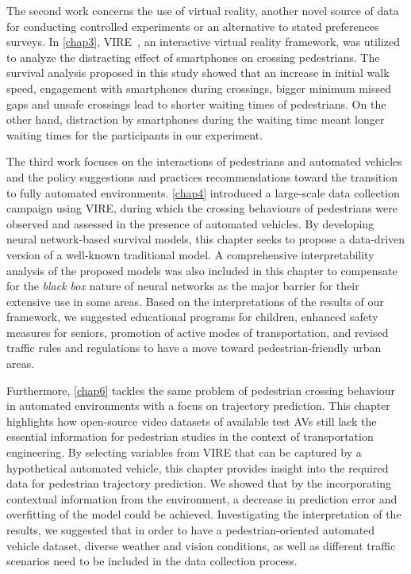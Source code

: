 The second work concerns the use of virtual reality, another novel source of data for conducting controlled experiments or an alternative to stated preferences surveys. In \cref{chap3}, VIRE~\cite{farooqvire}, an interactive virtual reality framework, was utilized to analyze the distracting effect of smartphones on crossing pedestrians. The survival analysis proposed in this study showed that an increase in
initial walk speed, engagement with smartphones during crossings, bigger minimum
missed gaps and unsafe crossings lead to shorter waiting times of pedestrians. On the other hand, distraction by smartphones during the waiting time meant
longer waiting times for the participants in our experiment. 

The third work focuses on the interactions of pedestrians and automated vehicles and the policy suggestions and practices recommendations toward the transition to fully automated environments. \cref{chap4} introduced a large-scale data collection campaign using VIRE, during which the crossing behaviours of pedestrians were observed and assessed in the presence of automated vehicles. By developing neural network-based survival models, this chapter seeks to propose a data-driven version of a well-known traditional model. A comprehensive interpretability analysis of the proposed models was also included in this chapter to compensate for the \textit{black box} nature of neural networks as the major barrier for their extensive use in some areas. Based on the interpretations of the results of our framework, we suggested educational programs for children, enhanced safety measures for seniors, promotion of active modes of transportation, and revised traffic rules and regulations to have a move toward pedestrian-friendly urban areas.

Furthermore, \cref{chap6} tackles the same problem of pedestrian crossing behaviour in automated environments with a focus on trajectory prediction. This chapter highlights how open-source video datasets of available test AVs still lack the essential information for pedestrian studies in the context of transportation engineering. By selecting variables from VIRE that can be captured by a hypothetical automated vehicle, this chapter provides insight into the required data for pedestrian trajectory prediction. We showed that by the incorporating contextual information from the environment, a decrease in prediction error and overfitting of the model could be achieved. Investigating the interpretation of the results, we suggested that in order to have a pedestrian-oriented automated vehicle dataset, diverse weather and vision conditions, as well as different traffic scenarios need to be included in the data collection process. 


